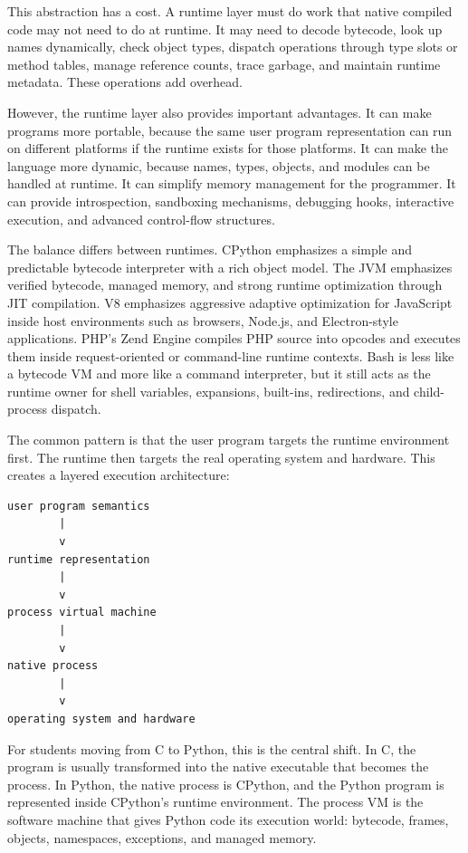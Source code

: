 \documentclass[a4paper,twoside]{report}
\begin{document}
This abstraction has a cost. A runtime layer must do work that native compiled code may not need to do at runtime. It may need to decode bytecode, look up names dynamically, check object types, dispatch operations through type slots or method tables, manage reference counts, trace garbage, and maintain runtime metadata. These operations add overhead.

However, the runtime layer also provides important advantages. It can make programs more portable, because the same user program representation can run on different platforms if the runtime exists for those platforms. It can make the language more dynamic, because names, types, objects, and modules can be handled at runtime. It can simplify memory management for the programmer. It can provide introspection, sandboxing mechanisms, debugging hooks, interactive execution, and advanced control-flow structures.

The balance differs between runtimes. CPython emphasizes a simple and predictable bytecode interpreter with a rich object model. The JVM emphasizes verified bytecode, managed memory, and strong runtime optimization through JIT compilation. V8 emphasizes aggressive adaptive optimization for JavaScript inside host environments such as browsers, Node.js, and Electron-style applications. PHP's Zend Engine compiles PHP source into opcodes and executes them inside request-oriented or command-line runtime contexts. Bash is less like a bytecode VM and more like a command interpreter, but it still acts as the runtime owner for shell variables, expansions, built-ins, redirections, and child-process dispatch.

The common pattern is that the user program targets the runtime environment first. The runtime then targets the real operating system and hardware. This creates a layered execution architecture:

\begin{verbatim}
user program semantics
        |
        v
runtime representation
        |
        v
process virtual machine
        |
        v
native process
        |
        v
operating system and hardware
\end{verbatim}

For students moving from C to Python, this is the central shift. In C, the program is usually transformed into the native executable that becomes the process. In Python, the native process is CPython, and the Python program is represented inside CPython's runtime environment. The process VM is the software machine that gives Python code its execution world: bytecode, frames, objects, namespaces, exceptions, and managed memory.
\end{document}
